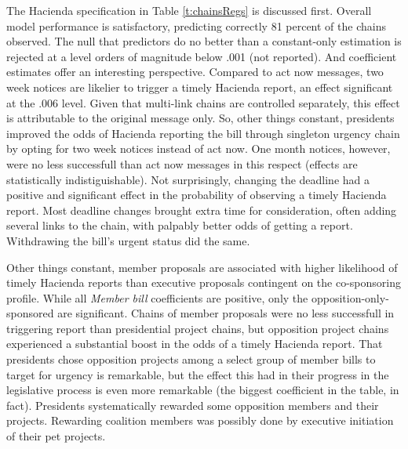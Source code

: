 \documentclass[letter,12pt]{article}
\begin{document}
The Hacienda specification in Table \ref{t:chainsRegs} is discussed first. Overall model performance is satisfactory, predicting correctly 81 percent of the chains observed. The null that predictors do no better than a constant-only estimation is rejected at a level orders of magnitude below .001 (not reported). And coefficient estimates offer an interesting perspective. Compared to act now messages, two week notices are likelier to trigger a timely Hacienda report, an effect significant at the .006 level. Given that multi-link chains are controlled separately, this effect is attributable to the original message only. So, other things constant, presidents improved the odds of Hacienda reporting the bill through singleton urgency chain by opting for two week notices instead of act now. One month notices, however, were no less successfull than act now messages in this respect (effects are statistically indistiguishable). Not surprisingly, changing the deadline had a positive and significant effect in the probability of observing a timely Hacienda report. Most deadline changes brought extra time for consideration, often adding several links to the chain, with palpably better odds of getting a report. Withdrawing the bill's urgent status did the same. 

Other things constant, member proposals are associated with higher likelihood of timely Hacienda reports than executive proposals contingent on the co-sponsoring profile. While all \emph{Member bill} coefficients are positive, only the opposition-only-sponsored are significant. Chains of member proposals were no less successfull in triggering report than presidential project chains, but opposition project chains experienced a substantial boost in the odds of a timely Hacienda report. That presidents chose opposition projects among a select group of member bills to target for urgency is remarkable, but the effect this had in their progress in the legislative process is even more remarkable (the biggest coefficient in the table, in fact). Presidents systematically rewarded some opposition members and their projects. Rewarding coalition members was possibly done by executive initiation of their pet projects.     

\end{document}
